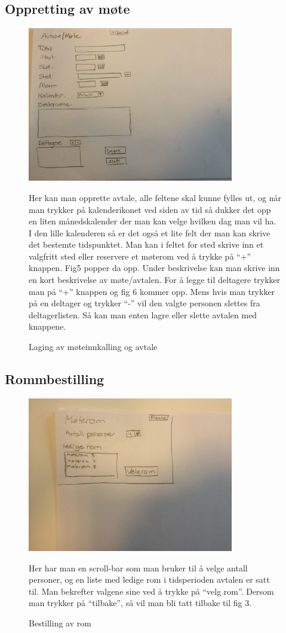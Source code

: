 \subsection{Oppretting av møte}
\begin{figure}[ht!]
\includegraphics[width=90mm]{fig4.jpg}
\caption{Laging av møteinnkalling og avtale}
Her kan man opprette avtale, alle feltene skal kunne fylles ut, og når man trykker på kalenderikonet ved siden av tid så dukker det opp en liten månedskalender der man kan velge hvilken dag man vil ha. I den lille kalenderen så er det også et lite felt der man kan skrive det bestemte tidspunktet. Man kan i feltet for sted skrive inn et valgfritt sted eller reservere et møterom ved å trykke på “+” knappen. Fig5 popper da opp.
Under beskrivelse kan man skrive inn en kort beskrivelse av møte/avtalen. For å legge til deltagere trykker man på  “+” knappen og fig 6 kommer opp. Mens hvis man trykker på en deltager og trykker “-”  vil den valgte personen slettes fra deltagerlisten. Så kan man enten lagre eller slette avtalen med knappene. 
\end{figure}

\newpage

\subsection{Rommbestilling}
\begin{figure}[ht!]
\includegraphics[width=90mm]{fig5.jpg}
\caption{Bestilling av rom}
Her har man en scroll-bar som man bruker til å velge antall personer, og en liste med ledige rom i tidsperioden avtalen er satt til. Man bekrefter valgene sine ved å trykke på “velg rom”. Dersom man trykker på “tilbake”, så vil man bli tatt tilbake til fig 3.
\end{figure}

